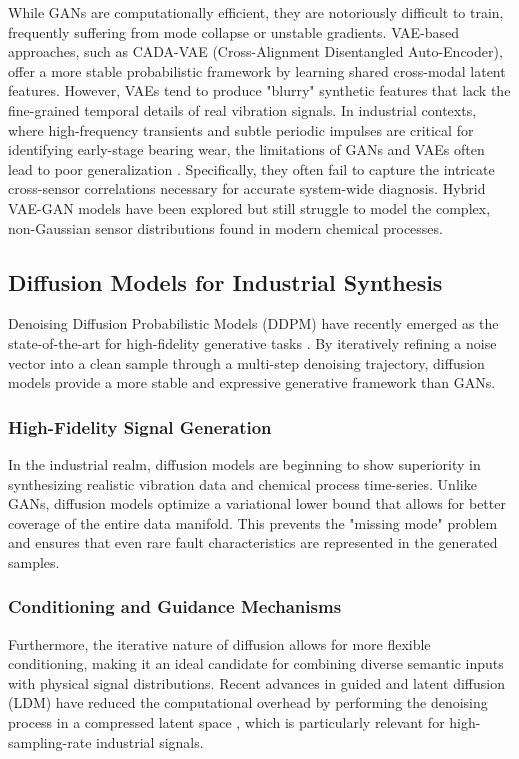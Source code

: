 While GANs are computationally efficient, they are notoriously difficult to train, frequently suffering from mode collapse or unstable gradients. VAE-based approaches, such as CADA-VAE (Cross-Alignment Disentangled Auto-Encoder), offer a more stable probabilistic framework by learning shared cross-modal latent features. However, VAEs tend to produce "blurry" synthetic features that lack the fine-grained temporal details of real vibration signals. In industrial contexts, where high-frequency transients and subtle periodic impulses are critical for identifying early-stage bearing wear, the limitations of GANs and VAEs often lead to poor generalization \cite{wang2018deep,han2020deep,liu2018deep,wu2021deep}. Specifically, they often fail to capture the intricate cross-sensor correlations necessary for accurate system-wide diagnosis. Hybrid VAE-GAN models have been explored but still struggle to model the complex, non-Gaussian sensor distributions found in modern chemical processes.

\subsection{Diffusion Models for Industrial Synthesis}
Denoising Diffusion Probabilistic Models (DDPM) have recently emerged as the state-of-the-art for high-fidelity generative tasks \cite{sohl2015deep,dhariwal2021diffusion}. By iteratively refining a noise vector into a clean sample through a multi-step denoising trajectory, diffusion models provide a more stable and expressive generative framework than GANs.

\subsubsection{High-Fidelity Signal Generation}
In the industrial realm, diffusion models are beginning to show superiority in synthesizing realistic vibration data and chemical process time-series. Unlike GANs, diffusion models optimize a variational lower bound that allows for better coverage of the entire data manifold. This prevents the "missing mode" problem and ensures that even rare fault characteristics are represented in the generated samples.

\subsubsection{Conditioning and Guidance Mechanisms}
Furthermore, the iterative nature of diffusion allows for more flexible conditioning, making it an ideal candidate for combining diverse semantic inputs with physical signal distributions. Recent advances in guided and latent diffusion (LDM) have reduced the computational overhead by performing the denoising process in a compressed latent space \cite{rombach2022high}, which is particularly relevant for high-sampling-rate industrial signals.

